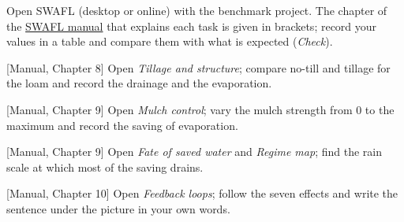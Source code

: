 {\small Open SWAFL (desktop or online) with the benchmark project. The chapter of the \href{https://github.com/halilunaziru73-creator/Coupled-Water-Fluxes-Pore-Scale-Dynamics-Precision-Irrigation-Mulching-Feedback-Loops/raw/main/Software/v1.1.0/SWAFL_Desktop/docs/manual_v1.1.0/SWAFL_Manual_v1.1.0.pdf}{SWAFL manual} that explains each task is given in brackets; record your values in a table and compare them with what is expected (\emph{Check}).}\par\vspace{3pt}
\begin{exlist}
\item {\color{khblue}[Manual, Chapter 8]} Open \emph{Tillage and structure}; compare no-till and tillage for the loam and record the drainage and the evaporation.\par{}
\item {\color{khblue}[Manual, Chapter 9]} Open \emph{Mulch control}; vary the mulch strength from 0 to the maximum and record the saving of evaporation.\par{}
\item {\color{khblue}[Manual, Chapter 9]} Open \emph{Fate of saved water} and \emph{Regime map}; find the rain scale at which most of the saving drains.\par{}
\item {\color{khblue}[Manual, Chapter 10]} Open \emph{Feedback loops}; follow the seven effects and write the sentence under the picture in your own words.\par{}
\end{exlist}

